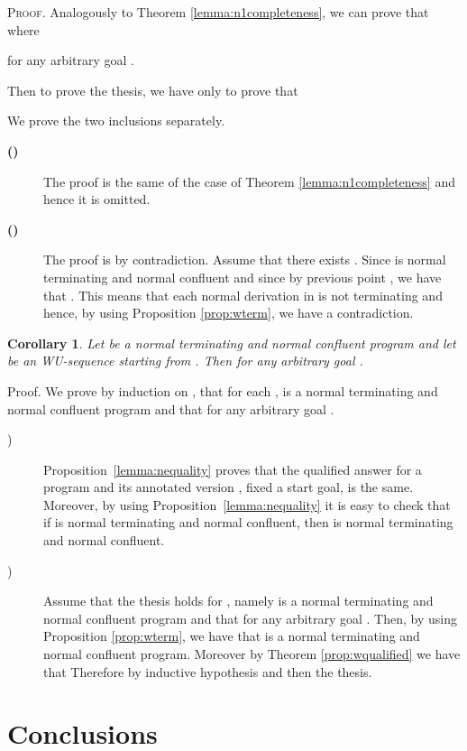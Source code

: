 \documentclass[final]{acmtrans2e}
\newtheorem{corollary}[theorem]{Corollary}
\begin{document}
\textsc{Proof.} Analogously to Theorem \ref{lemma:n1completeness}, we can prove that
 where
 
for any arbitrary goal .

Then to prove the thesis, we have only to prove that

We prove the two inclusions separately.
\begin{description}
  \item[{\bf () }]
  The proof is the same of the case  of Theorem \ref{lemma:n1completeness} and hence it is omitted.


  \item[{\bf () }]
  The proof is by contradiction. Assume that there exists . Since  is normal terminating and normal confluent and since by previous point
  , we have that .
  This means that each normal derivation in  is not terminating and hence, by using Proposition \ref{prop:wterm}, we have a contradiction.

\end{description}
\noindent{}

\begin{corollary}\label{lemma:wcompleteness}
 Let  be a normal terminating and normal confluent program and let  be an WU-sequence starting from                                                 . Then
 for any arbitrary goal
.
\end{corollary}

{\sc Proof.} We prove by induction on , that for each ,  is a normal terminating and normal confluent program and that  for any arbitrary goal
.
\begin{description}
  \item[)] Proposition~\ref{lemma:nequality} proves that the qualified answer for
a program  and its annotated version , fixed a start goal, is the same. Moreover, by using Proposition~\ref{lemma:nequality} it is easy to check that if  is normal terminating and normal confluent, then  is normal terminating and normal confluent.
  \item[)] Assume that the thesis holds for , namely  is a normal terminating and normal confluent program and that  for any arbitrary goal
. Then, by using Proposition \ref{prop:wterm}, we have that  is a normal terminating and normal confluent program. Moreover by Theorem \ref{prop:wqualified} we have that  Therefore by inductive hypothesis  and then the thesis.
\end{description}



\section{Conclusions}\label{sec:conclusion_and_future}
\end{document}
